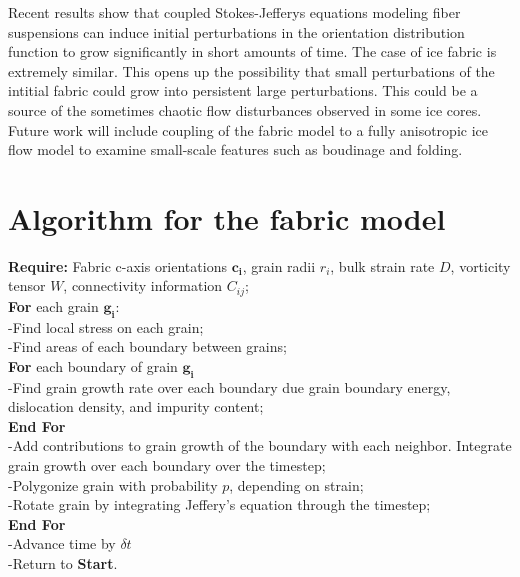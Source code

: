 \documentclass{igs}
\begin{document}
Recent results \citep{montgomery-smith2011} show that coupled Stokes-Jefferys equations modeling fiber suspensions can induce initial perturbations in the orientation distribution function to grow significantly in short amounts of time. The case of ice fabric is extremely similar. This opens up the possibility that small perturbations of the intitial fabric could grow into persistent large perturbations. This could be a source of the sometimes chaotic flow disturbances observed in some ice cores. Future work will include coupling of the fabric model to a fully anisotropic ice flow model to examine small-scale features such as boudinage and folding. 




\appendix
\section{Algorithm for the fabric model}

\textbf{Require:} Fabric c-axis orientations $\mathbf{c_i}$, grain radii $r_i$, bulk strain rate $D$, vorticity tensor  $W$, connectivity information $C_{ij}$;
\\
\textbf{For} each grain $\mathbf{g_i}$:
\\
\intent -Find local stress on each grain;
\\
\indent -Find areas of each boundary between grains;
\\
\textbf{For} each boundary of grain $\mathbf{g_i}$
\\
\indent -Find grain growth rate over each boundary due grain boundary energy, dislocation density, and impurity content;
\\
\textbf{End For}
\\
\indent -Add contributions to grain growth of the boundary with each neighbor. Integrate grain growth over each boundary over the timestep;
\\
\indent -Polygonize grain with probability $p$, depending on strain;
\\
\indent -Rotate grain by integrating Jeffery's equation through the timestep;
\\
\textbf{End For}
\\
-Advance time by $\delta t$
\\
-Return to \textbf{Start}.
\end{document}
